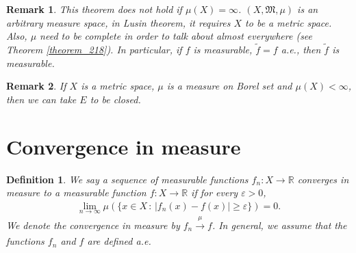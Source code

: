 \documentclass[11pt]{book}
\newtheorem{definition}{Definition}[chapter]
\newtheorem{remark}{Remark}[chapter]
\theoremstyle{definition}
\numberwithin{equation}{chapter}
\begin{document}
\medskip

\begin{remark}
This theorem does not hold if $\mu(X) = \infty$. $(X,\mathfrak{M},\mu)$ is an arbitrary measure space, in Lusin theorem, it requires $X$ to be a metric space. Also, $\mu$ need to be complete in order to talk about almost everywhere (see Theorem \ref{theorem_218}). In particular, if $f$ is measurable, $\widetilde{f} = f$ a.e., then $\widetilde{f}$ is measurable.
\end{remark}

\medskip

\begin{remark}
If $X$ is a metric space, $\mu$ is a measure on Borel set and $\mu(X) < \infty$, then we can take $E$ to be closed. 
\end{remark}

\medskip

\section{Convergence in measure}

\begin{definition}
We say a sequence of measurable functions $f_n: X \to \mathbb{R}$ converges in measure to a measurable function $f: X \to \mathbb{R}$ if for every $\varepsilon > 0$,
\begin{align*}
    \lim_{n\to\infty} \mu\left(\{x \in X \,:\, \left|f_n(x) - f(x)\right| \geq \varepsilon\} \right) = 0.
\end{align*}
We denote the convergence in measure by $f_n \xrightarrow[]{\mu} f$. In general, we assume that the functions $f_n$ and $f$ are defined a.e.
\end{definition}

\medskip
\end{document}
